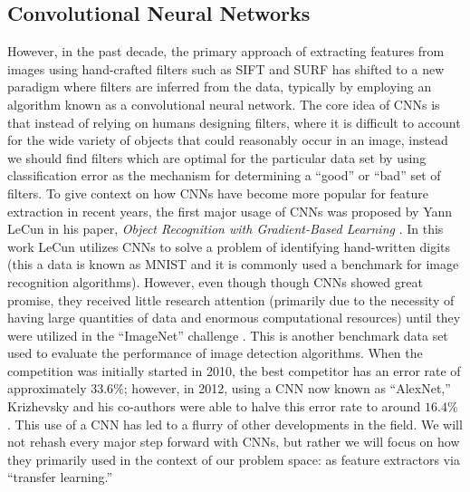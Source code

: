 \documentclass[../thesis.tex]{subfiles}
\begin{document}
\subsection{Convolutional Neural Networks}
However, in the past decade, the primary approach of extracting features from
images using hand-crafted filters such as SIFT and SURF has shifted to a new
paradigm where filters are inferred from the data, typically by employing an
algorithm known as a convolutional neural network. The core idea of CNNs is that
instead of relying on humans designing filters, where it is difficult to account
for the wide variety of objects that could reasonably occur in an image, instead
we should find filters which are optimal for the particular data set by using
classification error as the mechanism for determining a ``good'' or ``bad'' set
of filters. To give context on how CNNs have become more popular for feature
extraction in recent years, the first major usage of CNNs was proposed by Yann
LeCun in his paper, \textit{Object Recognition with Gradient-Based Learning}
\cite{lecun1999object}. In this work LeCun utilizes CNNs to solve a problem of
identifying hand-written digits (this a data is known as MNIST and it is
commonly used a benchmark for image recognition algorithms). However, even
though though CNNs showed great promise, they received little research attention
(primarily due to the necessity of having large quantities of data and enormous
computational resources) until they were utilized in the ``ImageNet'' challenge
\cite{russakovsky2015imagenet}. This is another benchmark data set used to
evaluate the performance of image detection algorithms. When the competition was
initially started in 2010, the best competitor has an error rate of
approximately $33.6\%$; however, in 2012, using a CNN now known as ``AlexNet,''
Krizhevsky and his co-authors were able to halve this error rate to around
$16.4\%$ \cite{krizhevsky2012imagenet}. This use of a CNN has led to a flurry of
other developments in the field. We will not rehash every major step forward
with CNNs, but rather we will focus on how they primarily used in the context of
our problem space: as feature extractors via ``transfer learning.''
\end{document}
